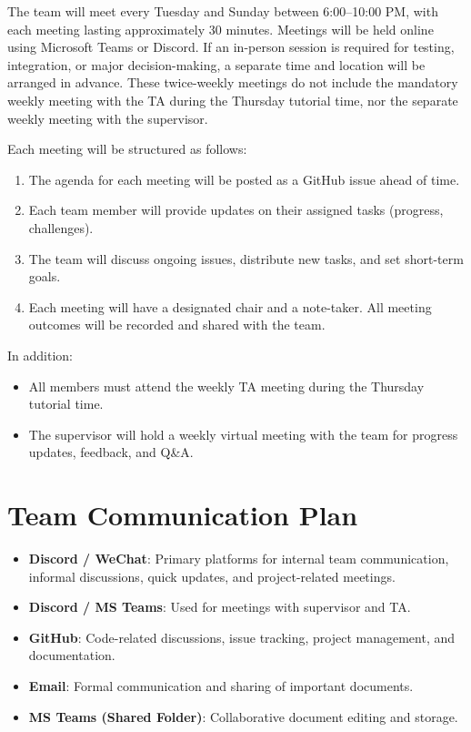 \documentclass{article}
\begin{document}


The team will meet every Tuesday and Sunday between 6:00--10:00 PM, with each meeting lasting approximately 30 minutes. 
Meetings will be held online using Microsoft Teams or Discord. If an in-person session is required for testing, integration, or major 
decision-making, a separate time and location will be arranged in advance. These twice-weekly meetings do not include 
the mandatory weekly meeting with the TA during the Thursday tutorial time, nor the separate weekly meeting with the supervisor.

Each meeting will be structured as follows:

\begin{enumerate}
    \item The agenda for each meeting will be posted as a GitHub issue ahead of time.
    \item Each team member will provide updates on their assigned tasks (progress, challenges).
    \item The team will discuss ongoing issues, distribute new tasks, and set short-term goals.
    \item Each meeting will have a designated chair and a note-taker. All meeting outcomes will be recorded and shared with the team.
\end{enumerate}

In addition:
\begin{itemize}
    \item All members must attend the weekly TA meeting during the Thursday tutorial time.
    \item The supervisor will hold a weekly virtual meeting with the team for progress updates, feedback, and Q\&A.
\end{itemize}





\section{Team Communication Plan}

\begin{itemize}
  \item \textbf{Discord / WeChat}: Primary platforms for internal team communication, informal discussions, quick updates, and project-related meetings.
  \item \textbf{Discord / MS Teams}: Used for meetings with supervisor and TA.
  \item \textbf{GitHub}: Code-related discussions, issue tracking, project management, and documentation.
  \item \textbf{Email}: Formal communication and sharing of important documents.
  \item \textbf{MS Teams (Shared Folder)}: Collaborative document editing and storage.
\end{itemize}
\end{document}
